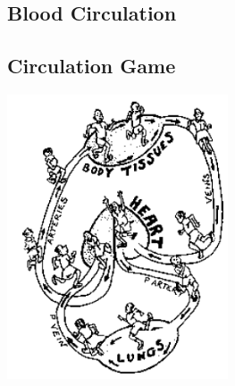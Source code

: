 \begin{multicols}{2}
\columnbreak


\section*{Blood Circulation} 


\subsection{Circulation Game} %
\label{sub:circulation-game}

\begin{center}
\includegraphics[width=0.49\textwidth]{./img/source/circulation-game.png}
\end{center}


\end{multicols}
